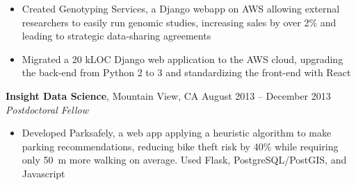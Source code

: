 \documentclass[margin,line]{resume}
\begin{document}
\begin{resume}
\begin{itemize}
    \item Created Genotyping Services, a Django webapp on AWS allowing external researchers to easily run genomic studies, increasing sales by over 2\% and leading to strategic data-sharing agreements
     \item Migrated a 20 kLOC Django web application to the AWS cloud, upgrading the back-end from Python 2 to 3 and standardizing the front-end with React%
    \end{itemize}
    \textbf{Insight Data Science}, Mountain View, CA \hfill August 2013 -- December 2013\vspace{1mm}\\\vspace{1mm}%
    \textsl{Postdoctoral Fellow}
    \begin{itemize}
    \item Developed Parksafely, a web app applying a heuristic algorithm to make parking recommendations, reducing bike theft risk by 40\% while requiring only 50~m more walking on average. Used Flask, PostgreSQL/PostGIS, and Javascript
    \end{itemize}

\pagebreak


\end{resume}
\end{document}
